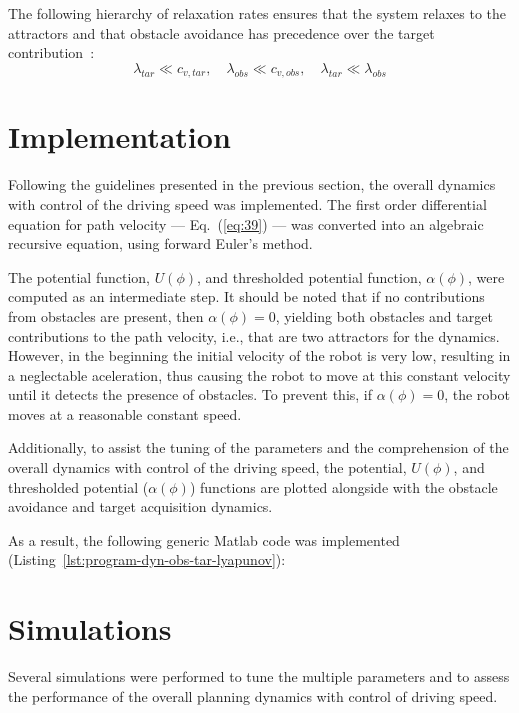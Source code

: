 The following hierarchy of relaxation rates ensures that the system relaxes to
the attractors and that obstacle avoidance has precedence over the target
contribution~\cite{bicho2000dynamic}:
\begin{equation}
  \label{eq:43}
  \lambda_{tar} \ll c_{v,tar},
  \quad
  \lambda_{obs} \ll c_{v,obs},
  \quad
  \lambda_{tar} \ll \lambda_{obs}
\end{equation}

\section{Implementation}%
\label{sec:implementation-lyapunov}
Following the guidelines presented in the previous section, the overall dynamics
with control of the driving speed was implemented. The first order differential
equation for path velocity --- Eq.~(\ref{eq:39}) --- was converted into an
algebraic recursive equation, using forward Euler's method. 

The potential function, $U(\phi)$, and thresholded potential function, $\alpha(\phi)$,
were computed as an intermediate step.
It should be noted that if no contributions from obstacles are present, then
$\alpha(\phi) = 0$, yielding both obstacles and target contributions to the path
velocity, i.e., that are two attractors for the dynamics. However, in the
beginning the initial velocity of the robot is very low, resulting in a
neglectable aceleration, thus causing the robot to move at this constant
velocity until it detects the presence of obstacles. To prevent this, if
$\alpha(\phi) = 0$, the robot moves at a reasonable constant speed.

Additionally, to assist the tuning of the parameters and the comprehension of
the overall dynamics with control of the driving speed, the potential,
$U(\phi)$, and thresholded potential ($\alpha(\phi)$) functions are plotted
alongside with the obstacle avoidance and target acquisition dynamics.

As a result, the following generic Matlab code was implemented (Listing~\ref{lst:program-dyn-obs-tar-lyapunov}):
%
%
\section{Simulations}%
\label{sec:sim-lyapunov}
Several simulations were performed to tune the multiple parameters and to assess
the performance of the overall planning dynamics with control of driving speed.

